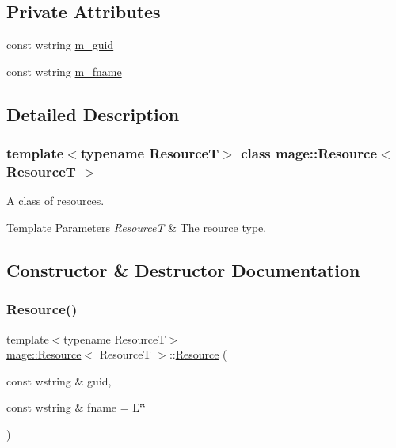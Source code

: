 \subsection*{Private Attributes}
\begin{DoxyCompactItemize}
\item 
const wstring \hyperlink{classmage_1_1_resource_ad2924d9bc9ddecf06475b52a8c7065d8}{m\+\_\+guid}
\item 
const wstring \hyperlink{classmage_1_1_resource_a52738047e1da0c3abaad4ea1e3d6a972}{m\+\_\+fname}
\end{DoxyCompactItemize}


\subsection{Detailed Description}
\subsubsection*{template$<$typename ResourceT$>$\newline
class mage\+::\+Resource$<$ Resource\+T $>$}

A class of resources.


\begin{DoxyTemplParams}{Template Parameters}
{\em ResourceT} & The reource type. \\
\hline
\end{DoxyTemplParams}


\subsection{Constructor \& Destructor Documentation}
\hypertarget{classmage_1_1_resource_ab8f31477e9e71a9c9d1be1f1c91ede20}{}\label{classmage_1_1_resource_ab8f31477e9e71a9c9d1be1f1c91ede20} 
\subsubsection{\texorpdfstring{Resource()}{Resource()}\hspace{0.1cm}{\footnotesize\ttfamily [1/3]}}
{\footnotesize\ttfamily template$<$typename ResourceT$>$ \\
\hyperlink{classmage_1_1_resource}{mage\+::\+Resource}$<$ ResourceT $>$\+::\hyperlink{classmage_1_1_resource}{Resource} (\begin{DoxyParamCaption}\item[{const wstring \&}]{guid,  }\item[{const wstring \&}]{fname = {\ttfamily L\char`\"{}\char`\"{}} }\end{DoxyParamCaption})\hspace{0.3cm}{\ttfamily [explicit]}}

